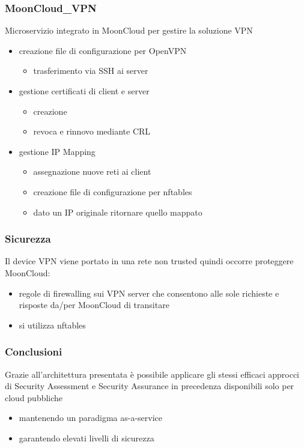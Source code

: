 \begin{frame}
	\frametitle{MoonCloud\_VPN}
	\alert{Microservizio} integrato in MoonCloud per gestire la soluzione VPN
	\begin{itemize}
		\item creazione file di \alert{configurazione} per \alert{OpenVPN}
		      \begin{itemize}
		      	\item \alert{trasferimento} via SSH ai server
		      \end{itemize}
		\item gestione \alert{certificati} di client e server
		      \begin{itemize}
		      	\item creazione
		      	\item revoca e rinnovo mediante \alert{CRL}
		      \end{itemize}
		\item gestione \alert{IP Mapping}
		      \begin{itemize}
		      	\item assegnazione nuove reti ai client
		      	\item creazione file di \alert{configurazione} per \alert{nftables}
		      	\item dato un IP originale ritornare quello mappato
		      \end{itemize}
	\end{itemize}
\end{frame}

\begin{frame}
	\frametitle{Sicurezza}
	Il device VPN viene portato in una rete \alert{non trusted} quindi
	occorre \alert{proteggere MoonCloud}:
	\begin{itemize}
		\item \alert{regole di firewalling} sui VPN server che consentono
		      alle \alert{sole richieste e risposte} da/per MoonCloud di transitare
	\end{itemize}
	
	\begin{itemize}
		\item si utilizza \alert{nftables}
	\end{itemize}
\end{frame}


\begin{frame}
    \frametitle{Conclusioni}
    Grazie all'architettura presentata è possibile applicare
    gli stessi efficaci approcci di \alert{Security Assessment}
    e \alert{Security Assurance} in precedenza disponibili solo per cloud pubbliche
    \begin{itemize}
        \item mantenendo un paradigma \alert{as-a-service}
        \item garantendo elevati livelli di sicurezza
    \end{itemize}
\end{frame}

